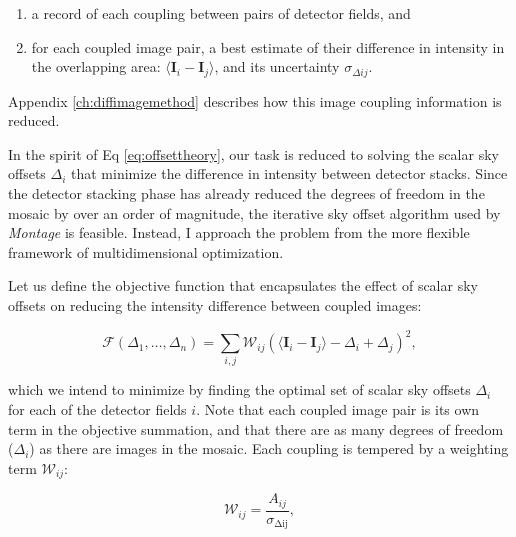 \documentclass[iop]{emulateapj}
\newcommand{\vect}[1]{\boldsymbol{#1}} %
\newcommand{\sw}[1]{\textit{#1}} %
\begin{document}
\begin{enumerate}
    \item a record of each coupling between pairs of detector fields, and
    \item for each coupled image pair, a best estimate of their difference in intensity in the overlapping area: $\langle \vect{I}_i-\vect{I}_j \rangle$, and its uncertainty $\sigma_{\Delta ij}$.
\end{enumerate}

\noindent Appendix \ref{ch:diffimagemethod} describes how this image coupling information is reduced.

In the spirit of Eq \ref{eq:offsettheory}, our task is reduced to solving the scalar sky offsets $\Delta_i$ that minimize the difference in intensity between detector stacks.
Since the detector stacking phase has already reduced the degrees of freedom in the mosaic by over an order of magnitude, the iterative sky offset algorithm used by \sw{Montage} is feasible. Instead, I approach the problem from the more flexible framework of multidimensional optimization.

Let us define the objective function that encapsulates the effect of scalar sky offsets on reducing the intensity difference between coupled images:

\begin{equation}
    \mathcal{F} \left(\Delta_1,\ldots,\Delta_n \right) = \sum_{i,j} \mathcal{W}_{ij} \left( \langle \vect{I}_i - \vect{I}_j \rangle - \Delta_i + \Delta_j \right)^2,
    \label{eq:objf}
\end{equation}

\noindent which we intend to minimize by finding the optimal set of scalar sky offsets $\Delta_i$ for each of the detector fields $i$. Note that each coupled image pair is its own term in the objective summation, and that there are as many degrees of freedom ($\Delta_i$) as there are images in the mosaic. Each coupling is tempered by a weighting term $\mathcal{W}_{ij}$:

\begin{equation}
    \mathcal{W}_{ij} = \frac{A_{ij}}{\sigma_{\mathrm{\Delta ij}}},
\end{equation}
\end{document}
